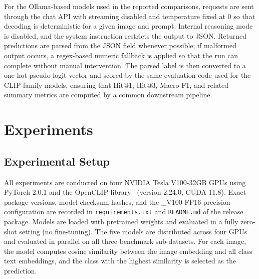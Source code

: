 \documentclass[electronics,article,submit,pdftex,moreauthors]{Definitions/mdpi}
\begin{document}
For the Ollama-based models used in the reported comparisons, requests are sent through the chat API with streaming disabled and temperature fixed at 0 so that decoding is deterministic for a given image and prompt. Internal reasoning mode is disabled, and the system instruction restricts the output to JSON. Returned predictions are parsed from the JSON field whenever possible; if malformed output occurs, a regex-based numeric fallback is applied so that the run can complete without manual intervention. The parsed label is then converted to a one-hot pseudo-logit vector and scored by the same evaluation code used for the CLIP-family models, ensuring that Hit@1, Hit@3, Macro-F1, and related summary metrics are computed by a common downstream pipeline.


\section{Experiments}
\label{sec:experiments}

\subsection{Experimental Setup}

All experiments are conducted on four NVIDIA Tesla V100-32GB GPUs using PyTorch 2.0.1 and the OpenCLIP library~\cite{cherti2023reproducible} (version 2.24.0, CUDA 11.8). Exact package versions, model checksum hashes, and the \_V100 FP16 precision configuration are recorded in \texttt{requirements.txt} and \texttt{README.md} of the release package.
Models are loaded with pretrained weights and evaluated in a fully zero-shot setting (no fine-tuning).
The five models are distributed across four GPUs and evaluated in parallel on all three benchmark sub-datasets.
For each image, the model computes cosine similarity between the image embedding and all class text embeddings, and the class with the highest similarity is selected as the prediction.
\end{document}
